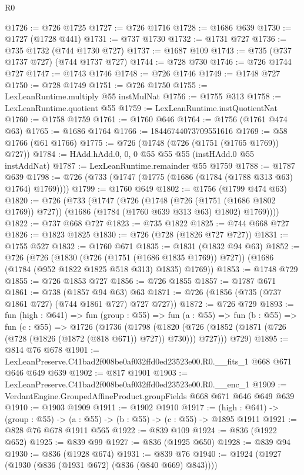 \begin{lexlean}{R0}
\begin{coremodule}
@1726 := @726 @1725
@1727 := @726 @1716
@1728 := @1686 @639
@1730 := @1727 (@1728 @441)
@1731 := @737 @1730
@1732 := @1731 @727
@1736 := @735 @1732 (@744 @1730 @727)
@1737 := @1687 @109
@1743 := @735 (@737 @1737 @727) (@744 @1737 @727)
@1744 := @728 @730
@1746 := @726 @1744 @727
@1747 := @1743 @1746
@1748 := @726 @1746
@1749 := @1748 @727
@1750 := @728 @1749
@1751 := @726 @1750
@1755 := LexLeanRuntime.multiply @55 instMulNat
@1756 := @1755 @313
@1758 := LexLeanRuntime.quotient @55
@1759 := LexLeanRuntime.instQuotientNat
@1760 := @1758 @1759
@1761 := @1760 @646
@1764 := @1756 (@1761 @474 @63)
@1765 := @1686 @1764
@1766 := 18446744073709551616
@1769 := @58 @1766 (@61 @1766)
@1775 := @726 (@1748 (@726 (@1751 (@1765 @1769)) @727))
@1784 := HAdd.hAdd.{0, 0, 0} @55 @55 @55 (instHAdd.{0} @55 instAddNat)
@1787 := LexLeanRuntime.remainder @55 @1759
@1788 := @1787 @639
@1798 := @726 (@733 (@1747 (@1775 (@1686 (@1784 (@1788 @313 @63) @1764) @1769))))
@1799 := @1760 @649
@1802 := @1756 (@1799 @474 @63)
@1820 := @726
    (@733
      (@1747
        (@726
          (@1748 (@726 (@1751 (@1686 @1802 @1769)) @727))
          (@1686 (@1784 (@1760 @639 @313 @63) @1802) @1769))))
@1822 := @737 @668 @727
@1823 := @735 @1822
@1825 := @744 @668 @727
@1826 := @1823 @1825
@1830 := @726 (@728 (@1826 @727 @727))
@1831 := @1755 @527
@1832 := @1760 @671
@1835 := @1831 (@1832 @94 @63)
@1852 := @726
    (@726
      (@1830 (@726 (@1751 (@1686 @1835 @1769)) @727))
      (@1686 (@1784 (@952 @1822 @1825 @518 @313) @1835) @1769))
@1853 := @1748 @729
@1855 := @726 @1853 @727
@1856 := @726 @1855
@1857 := @1787 @671
@1861 := @738 (@1857 @94 @63) @63
@1871 := @726 (@1856 (@735 (@737 @1861 @727) (@744 @1861 @727) @727 @727))
@1872 := @726 @729
@1893 := fun (high : @641) =>
  fun (group : @55) =>
  fun (a : @55) =>
  fun (b : @55) =>
  fun (c : @55) =>
  @1726
    (@1736
      (@1798
        (@1820 (@726 (@1852 (@1871 (@726 (@728 (@1826 (@1872 (@818 @671)) @727)) @730))) @727)))
      @729)
@1895 := @814 @76 @678
@1901 := LexLeanPreserve.C41bad2f008be0af032ffd0ed23523e00.R0.__fits_1 @668 @671 @646 @649 @639
@1902 := @817 @1901
@1903 := LexLeanPreserve.C41bad2f008be0af032ffd0ed23523e00.R0.__enc_1
@1909 := VerdantEngine.GroupedAffineProduct.groupFields @668 @671 @646 @649 @639
@1910 := @1903 @1909
@1911 := @1902 @1910
@1917 := (high : @641) -> (group : @55) -> (a : @55) -> (b : @55) -> (c : @55) -> @1895 @1911
@1921 := @828 @76 @678 @1911 @565
@1922 := @839 @109
@1924 := @836 (@1922 @652)
@1925 := @839 @99
@1927 := @836 (@1925 @650)
@1928 := @839 @94
@1930 := @836 (@1928 @674)
@1931 := @839 @76
@1940 := @1924 (@1927 (@1930 (@836 (@1931 @672) (@836 (@840 @669) @843))))

\end{coremodule}
\end{lexlean}

